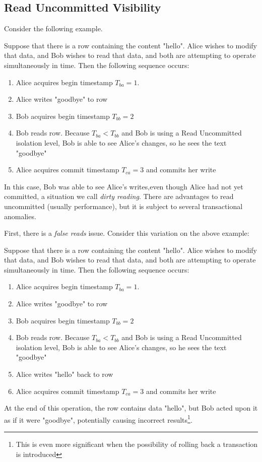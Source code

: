 \subsection{Read Uncommitted Visibility}
Consider the following example.
\begin{exmp}
				Suppose that there is a row containing the content "hello". Alice wishes to modify that data, and Bob wishes to read that data, and both are attempting to operate simultaneously in time. Then the following sequence occurs:
				\begin{enumerate}
					\item Alice acquires begin timestamp $T_{ba} = 1$.
					\item Alice writes "goodbye" to row
					\item Bob acquires begin timestamp $T_{bb} = 2$
					\item Bob reads row. Because $T_{ba} < T_{bb}$ and Bob is using a Read Uncommitted isolation level, Bob is able to see Alice's changes, so he sees the text "goodbye"
					\item Alice acquires commit timestamp $T_{ca} = 3$ and commits her write	
				\end{enumerate}
\end{exmp}
In this case, Bob was able to see Alice's writes,even though Alice had not yet committed, a situation we call \emph{dirty reading}. There are advantages to read uncommitted (usually performance), but it is subject to several transactional anomalies.

First, there is a \emph{false reads} issue. Consider this variation on the above example:

\begin{exmp}
				Suppose that there is a row containing the content "hello". Alice wishes to modify that data, and Bob wishes to read that data, and both are attempting to operate simultaneously in time. Then the following sequence occurs:
\begin{enumerate}
	\item Alice acquires begin timestamp $T_{ba} = 1$.
	\item Alice writes "goodbye" to row
	\item Bob acquires begin timestamp $T_{bb} = 2$
	\item Bob reads row. Because $T_{ba} < T_{bb}$ and Bob is using a Read Uncommitted isolation level, Bob is able to see Alice's changes, so he sees the text "goodbye"
	\item Alice writes "hello" back to row
	\item Alice acquires commit timestamp $T_{ca} = 3$ and commits her write	
\end{enumerate}
\end{exmp}
At the end of this operation, the row contains data "hello", but Bob acted upon it as if it were "goodbye", potentially causing incorrect results\footnote{This is even more significant when the possibility of rolling back a transaction is introduced}.

